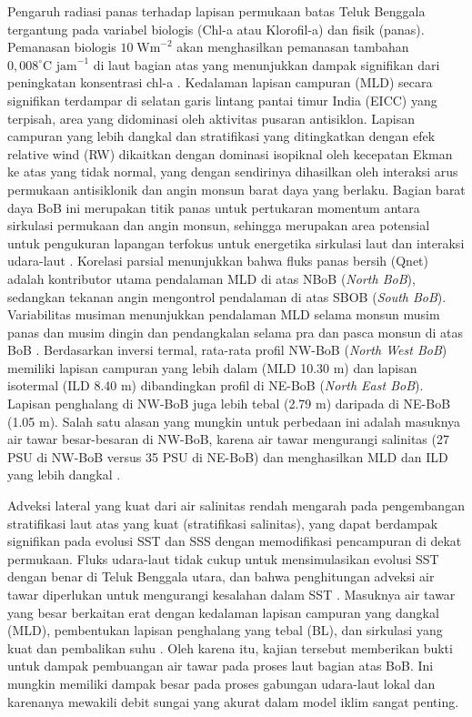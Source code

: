 \begin{spacing}{1.5}
	Pengaruh radiasi panas terhadap lapisan permukaan batas Teluk Benggala tergantung pada variabel biologis (Chl-a atau Klorofil-a) dan fisik (panas). Pemanasan biologis $10\; \text{Wm}^{-2}$ akan menghasilkan pemanasan tambahan $0,008^\circ \text{C jam}^{-1}$ di laut bagian atas yang menunjukkan dampak signifikan dari peningkatan konsentrasi chl-a . Kedalaman lapisan campuran (MLD) secara signifikan terdampar di selatan garis lintang pantai timur India (EICC) yang terpisah, area yang didominasi oleh aktivitas pusaran antisiklon. Lapisan campuran yang lebih dangkal dan stratifikasi yang ditingkatkan dengan efek relative wind (RW) dikaitkan dengan dominasi isopiknal oleh kecepatan Ekman ke atas yang tidak normal, yang dengan sendirinya dihasilkan oleh interaksi arus permukaan antisiklonik dan angin monsun barat daya yang berlaku. Bagian barat daya BoB ini merupakan titik panas untuk pertukaran momentum antara sirkulasi permukaan dan angin monsun, sehingga merupakan area potensial untuk pengukuran lapangan terfokus untuk energetika sirkulasi laut dan interaksi udara-laut . Korelasi parsial menunjukkan bahwa fluks panas bersih (Qnet) adalah kontributor utama pendalaman MLD di atas NBoB (\textit{North BoB}), sedangkan tekanan angin mengontrol pendalaman di atas SBOB (\textit{South BoB}). Variabilitas musiman menunjukkan pendalaman MLD selama monsun musim panas dan musim dingin dan pendangkalan selama pra dan pasca monsun di atas BoB . Berdasarkan inversi termal, rata-rata profil NW-BoB (\textit{North West BoB}) memiliki lapisan campuran yang lebih dalam (MLD 10.30 m) dan lapisan isotermal (ILD 8.40 m) dibandingkan profil di NE-BoB (\textit{North East BoB}). Lapisan penghalang di NW-BoB juga lebih tebal (2.79 m) daripada di NE-BoB (1.05 m). Salah satu alasan yang mungkin untuk perbedaan ini adalah masuknya air tawar besar-besaran di NW-BoB, karena air tawar mengurangi salinitas (27 PSU di NW-BoB versus 35 PSU di NE-BoB) dan menghasilkan MLD dan ILD yang lebih dangkal .
	
	Adveksi lateral yang kuat dari air salinitas rendah mengarah pada pengembangan stratifikasi laut atas yang kuat (stratifikasi salinitas), yang dapat berdampak signifikan pada evolusi SST dan SSS dengan memodifikasi pencampuran di dekat permukaan. Fluks udara-laut tidak cukup untuk mensimulasikan evolusi SST dengan benar di Teluk Benggala utara, dan bahwa penghitungan adveksi air tawar diperlukan untuk mengurangi kesalahan dalam SST . Masuknya air tawar yang besar berkaitan erat dengan kedalaman lapisan campuran yang dangkal (MLD), pembentukan lapisan penghalang yang tebal (BL), dan sirkulasi yang kuat dan pembalikan suhu . Oleh karena itu, kajian tersebut memberikan bukti untuk dampak pembuangan air tawar pada proses laut bagian atas BoB. Ini mungkin memiliki dampak besar pada proses gabungan udara-laut lokal dan karenanya mewakili debit sungai yang akurat dalam model iklim sangat penting.
	

\end{spacing}

